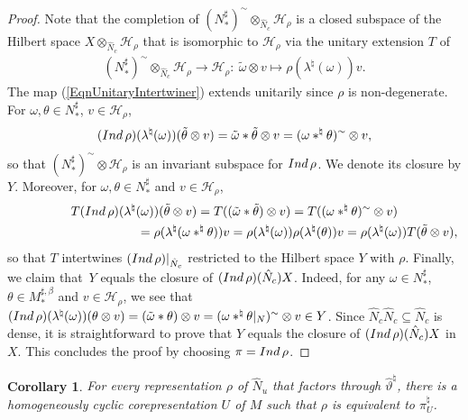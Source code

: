 \documentclass[11pt]{article}
\numberwithin{equation}{section}
\newtheorem{cor}[thm]{Corollary}
\theoremstyle{definition}
\newcommand{\cHil}{\mathcal{H}}
\newcommand{\Ind}{{\rm Ind}\,}
\begin{document}
\begin{proof}
 Note that the completion of $  (N_\ast^{\sharp})^{\sim}   \otimes_{\hat{N}_c}  \cHil_\rho$ is a closed subspace of the Hilbert space $X  \otimes_{\hat{N}_c} \cHil_\rho$ that is isomorphic to $\cHil_\rho$ via the unitary  extension $T$ of
\begin{gather}\label{EqnUnitaryIntertwiner}
( N_\ast^\sharp) ^\sim  \otimes_{\hat{N}_c} \cHil_\rho \rightarrow \cHil_\rho: \ \tilde{\omega} \otimes v \mapsto \rho(\lambda ^\natural(\omega)) v.
\end{gather}
The map (\ref{EqnUnitaryIntertwiner}) extends unitarily since $\rho$ is non-degenerate. For $\omega, \theta \in N_\ast^\sharp$, $v \in \cHil_\rho$,
\[
(\Ind \rho)(\lambda^\natural(\omega))  (\tilde{\theta} \otimes v) = \tilde{\omega} \ast \tilde{\theta} \otimes v = (\omega \ast^\natural \theta)^\sim \otimes v,
\]
 so that $(N_\ast^\sharp)^\sim  \otimes \cHil_\rho$ is an invariant subspace for $ \Ind \rho $. We denote its closure by $Y$. Moreover, for $\omega, \theta \in N_\ast^\sharp$ and $v \in \cHil_\rho$,
\begin{gather*}
  T    (\Ind \rho)  (\lambda^\natural(\omega))   ( \tilde{\theta} \otimes v )  =
T ((\tilde{\omega} \ast \tilde{\theta})  \otimes v)  = T ((\omega \ast^\natural \theta)^\sim \otimes v)  \\
\phantom{T    (\Ind \rho)  (\lambda^\natural(\omega))   ( \tilde{\theta} \otimes v ) }{}
=   \rho(\lambda^\natural(\omega \ast^\natural \theta)) v  =   \rho(\lambda^\natural(\omega)) \rho(\lambda^\natural( \theta)) v =
  \rho(\lambda^\natural(\omega)) T  ( \tilde{\theta} \otimes v ),
\end{gather*}
so that $T$ intertwines  $ (\Ind \rho)\vert_{\hat{N}_c}  $ restricted to the Hilbert space   $Y$ with $\rho$. Finally, we claim that~$Y$ equals the closure of $(\Ind\rho)(\hat{N}_c) X$. Indeed, for any $\omega \in N_\ast^\sharp$, $\theta \in M_\ast^{\sharp, \beta}$ and $v \in \cHil_\rho$, we see that $(\Ind\rho)(\lambda^\natural(\omega)) ( \theta \otimes v) = (\tilde{\omega} \ast \theta) \otimes v = (\omega \ast^\natural \theta\vert_N)^\sim \otimes v \in Y$. Since $\hat{N}_c \hat{N}_c \subseteq \hat{N}_c$ is dense, it is straightforward to prove that  $Y$ equals the closure of $(\Ind\rho)(\hat{N}_c) X$ in $X$. This concludes the proof by choosing $\pi = \Ind \rho$.
\end{proof}

\begin{cor}\label{CorRep}
For every representation $\rho$ of $\hat{N}_u$ that factors through $\hat{\vartheta}^\natural$, there is a homogeneously cyclic corepresentation $U$ of $M$ such that $\rho$ is equivalent to $\pi_U^\natural$.
\end{cor}
\end{document}
